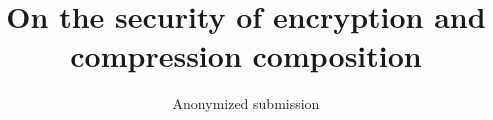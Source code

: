 \documentclass[letterpaper,twocolumn,10pt]{article}
\begin{document}
\title{On the security of encryption and compression composition}

\author{
    Anonymized submission
}

\maketitle

\thispagestyle{empty}

















\end{document}
